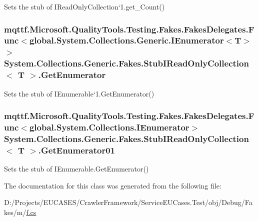 Sets the stub of I\-Read\-Only\-Collection`1.get\-\_\-\-Count()

\hypertarget{class_system_1_1_collections_1_1_generic_1_1_fakes_1_1_stub_i_read_only_collection_3_01_t_01_4_ae12522305da461bf87be05b9a1912286}{
\subsubsection[{Get\-Enumerator}]{\setlength{\rightskip}{0pt plus 5cm}mqttf.\-Microsoft.\-Quality\-Tools.\-Testing.\-Fakes.\-Fakes\-Delegates.\-Func$<$global.\-System.\-Collections.\-Generic.\-I\-Enumerator$<$T$>$ $>$ System.\-Collections.\-Generic.\-Fakes.\-Stub\-I\-Read\-Only\-Collection$<$ T $>$.Get\-Enumerator}}\label{class_system_1_1_collections_1_1_generic_1_1_fakes_1_1_stub_i_read_only_collection_3_01_t_01_4_ae12522305da461bf87be05b9a1912286}


Sets the stub of I\-Enumerable`1.Get\-Enumerator()

\hypertarget{class_system_1_1_collections_1_1_generic_1_1_fakes_1_1_stub_i_read_only_collection_3_01_t_01_4_a63de8ffcd679091fef87c8065faf9639}{
\subsubsection[{Get\-Enumerator01}]{\setlength{\rightskip}{0pt plus 5cm}mqttf.\-Microsoft.\-Quality\-Tools.\-Testing.\-Fakes.\-Fakes\-Delegates.\-Func$<$global.\-System.\-Collections.\-I\-Enumerator$>$ System.\-Collections.\-Generic.\-Fakes.\-Stub\-I\-Read\-Only\-Collection$<$ T $>$.Get\-Enumerator01}}\label{class_system_1_1_collections_1_1_generic_1_1_fakes_1_1_stub_i_read_only_collection_3_01_t_01_4_a63de8ffcd679091fef87c8065faf9639}


Sets the stub of I\-Enumerable.\-Get\-Enumerator()



The documentation for this class was generated from the following file\-:\begin{DoxyCompactItemize}
\item 
D\-:/\-Projects/\-E\-U\-C\-A\-S\-E\-S/\-Crawler\-Framework/\-Service\-E\-U\-Cases.\-Test/obj/\-Debug/\-Fakes/m/\hyperlink{m_2f_8cs}{f.\-cs}\end{DoxyCompactItemize}
